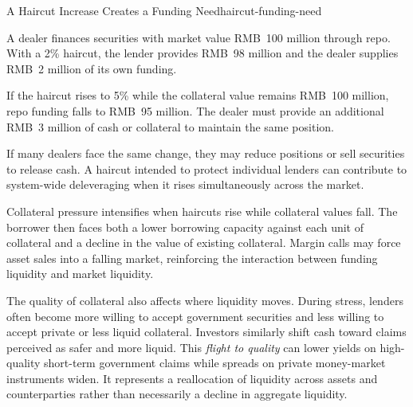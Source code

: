 \begin{example}{A Haircut Increase Creates a Funding Need}{haircut-funding-need}

A dealer finances securities with market value RMB~100 million through repo. With a 2\% haircut, the lender provides RMB~98 million and the dealer supplies RMB~2 million of its own funding.

If the haircut rises to 5\% while the collateral value remains RMB~100 million, repo funding falls to RMB~95 million. The dealer must provide an additional RMB~3 million of cash or collateral to maintain the same position.

If many dealers face the same change, they may reduce positions or sell securities to release cash. A haircut intended to protect individual lenders can contribute to system-wide deleveraging when it rises simultaneously across the market.

\end{example}

Collateral pressure intensifies when haircuts rise while collateral values fall. The borrower then faces both a lower borrowing capacity against each unit of collateral and a decline in the value of existing collateral. Margin calls may force asset sales into a falling market, reinforcing the interaction between funding liquidity and market liquidity.

The quality of collateral also affects where liquidity
moves. During stress, lenders often become more willing
to accept government securities and less willing to
accept private or less liquid collateral. Investors
similarly shift cash toward claims perceived as safer
and more liquid. This \emph{flight to quality} can lower
yields on high-quality short-term government claims
while spreads on private money-market instruments
widen. It represents a reallocation of liquidity
across assets and counterparties rather than
necessarily a decline in aggregate liquidity.


